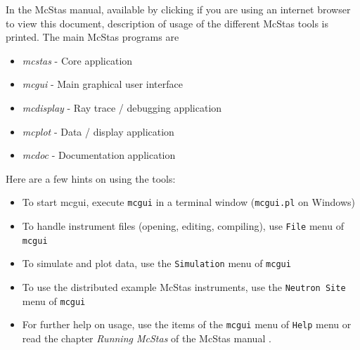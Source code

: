 \documentclass[a4paper]{article}
\begin{document}
In the McStas manual, available by clicking
if you are using an internet browser to view this document, description
of usage of the different McStas tools is printed. The main McStas
programs are
\begin{itemize}
\item{\emph{mcstas} - Core application}
\item{\emph{mcgui} - Main graphical user interface}
\item{\emph{mcdisplay} - Ray trace / debugging application}
\item{\emph{mcplot} - Data / display application}
\item{\emph{mcdoc} - Documentation application}
\end{itemize}
Here are a few hints on using the tools:
\begin{itemize}
\item To start mcgui, execute \verb+mcgui+ in a terminal window
  (\verb+mcgui.pl+ on Windows)
\item To handle instrument files (opening, editing, compiling), use \verb+File+ menu of \verb+mcgui+
\item To simulate and plot data, use the \verb+Simulation+ menu of \verb+mcgui+
\item To use the distributed example McStas instruments, use the \verb+Neutron Site+ menu of \verb+mcgui+
\item For further help on usage, use the items of the \verb+mcgui+
  menu of \verb+Help+ menu or read the chapter \emph{Running McStas}
  of the McStas manual \cite{Manual}.
\end{itemize}
\end{document}
